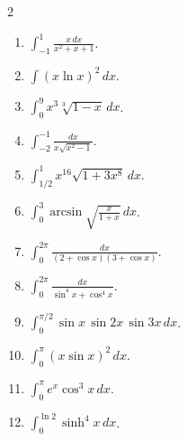 \begin{enumerate}
\begin{multicols}{2}
\begin{enumerate}
  \item $\displaystyle \int_{-1}^{1} \frac{x\,dx}{x^{2}+x+1}$.

  \item $\displaystyle \int (x\ln x)^{2}\,dx$.

  \item $\displaystyle \int_{0}^{9} x^{3}\sqrt[3]{1-x}\,dx$.

  \item $\displaystyle \int_{-2}^{-1} \frac{dx}{x\sqrt{x^{2}-1}}$.

  \item $\displaystyle \int_{1/2}^{1} x^{16}\sqrt{1+3x^{8}}\,dx$.

  \item $\displaystyle \int_{0}^{3} \arcsin\sqrt{\frac{x}{1+x}}\,dx$.

  \item $\displaystyle \int_{0}^{2\pi} \frac{dx}{(2+\cos x)(3+\cos x)}$.

  \item $\displaystyle \int_{0}^{2\pi} \frac{dx}{\sin^{4}x+\cos^{4}x}$.

  \item $\displaystyle \int_{0}^{\pi/2} \sin x\,\sin 2x\,\sin 3x\,dx$.

  \item $\displaystyle \int_{0}^{\pi} (x\sin x)^{2}\,dx$.

  \item $\displaystyle \int_{0}^{\pi} e^{x}\cos^{3}x\,dx$.

  \item $\displaystyle \int_{0}^{\ln 2} \sinh^{4}x\,dx$.
\end{enumerate}
    
\end{multicols}
\end{enumerate}
